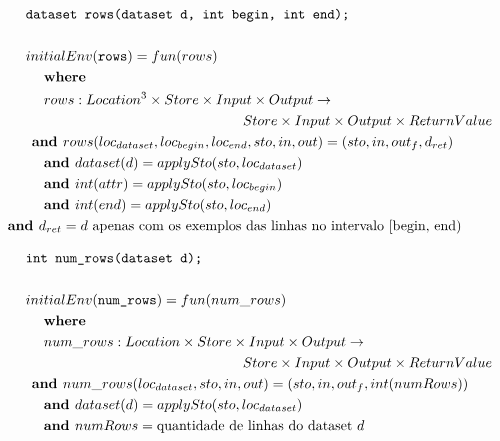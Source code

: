 \documentclass[12pt]{article}
\begin{document}
\begin{align*}
	&\texttt{dataset rows(dataset d, int begin, int end);} \\
	\\
	&initialEnv(\texttt{rows}) = fun(rows) \\
	&\hspace{3ex}\textbf{where } \\
	&\hspace{3ex} rows:Location^3\times Store\times Input\times Output\rightarrow \\
	&\hspace{36ex}Store\times Input\times Output\times ReturnValue \\
	&\hspace{1ex}\textbf{and } rows(loc_{dataset}, loc_{begin}, loc_{end},sto,in,out) = (sto,in,out_f,d_{ret})\\
	&\hspace{3ex}\textbf{and } dataset(d) = applySto(sto, loc_{dataset}) \\
	&\hspace{3ex}\textbf{and } int(attr) = applySto(sto, loc_{begin}) \\
	&\hspace{3ex}\textbf{and } int(end) = applySto(sto, loc_{end}) \\
	&\hspace{-3ex}\textbf{and } d_{ret} = d\text{ apenas com os exemplos das linhas no intervalo [begin, end)} \\
\end{align*}


\begin{align*}
	&\texttt{int num\_rows(dataset d);} \\
	\\
	&initialEnv(\texttt{num\_rows}) = fun(num\_rows) \\
	&\hspace{3ex}\textbf{where } \\
	&\hspace{3ex} num\_rows:Location\times Store\times Input\times Output\rightarrow \\
	&\hspace{36ex}Store\times Input\times Output\times ReturnValue \\
	&\hspace{1ex}\textbf{and } num\_rows(loc_{dataset},sto,in,out) = (sto,in,out_f,int(numRows))\\
	&\hspace{3ex}\textbf{and } dataset(d) = applySto(sto, loc_{dataset}) \\
	&\hspace{3ex}\textbf{and } numRows = \text{quantidade de linhas do dataset }d \\
\end{align*}
\end{document}
